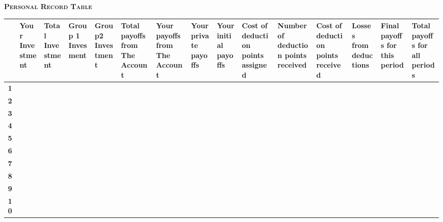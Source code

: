 \documentclass[9pt]{article}
\begin{document}
\thispagestyle{empty}

\begin{landscape}


{\bf \scshape Personal Record Table}


\begin{table}[H]
\centering
      \begin{tabular}{|c|p{1.5cm}|p{1.5cm}|p{1.5cm}|p{1.5cm}|p{1.5cm}|p{1.5cm}|p{1.5cm}|p{1.5cm}|p{1.5cm}|p{1.5cm}|p{1.5cm}|p{1.5cm}|p{1.5cm}|p{1.5cm}|} \hline

         & {\bf Your Investment}
         & {\bf Total Investment}
         & {\bf Group 1 Invesment}
         & {\bf Group2 Investment}
         & {\bf Total payoffs from The Account}
         & {\bf Your payoffs from The Account}
         & {\bf Your private payoffs}
         & {\bf Your initial payoffs}
         & {\bf Cost of deduction points assigned}
         & {\bf Number of deduction points received}
         & {\bf Cost of deduction points received}
         & {\bf Losses from deductions}
         & {\bf Final payoffs for this period}
         & {\bf Total payoffs for all periods}\\



         
         \hline\hline
         
         {\bf 1} & & & & & & & & & & & & & &\\[2ex]\hline
         {\bf 2} & & & & & & & & & & & & & &\\[2ex]\hline
         {\bf 3} & & & & & & & & & & & & & &\\[2ex]\hline
         {\bf 4} & & & & & & & & & & & & & &\\[2ex]\hline
         {\bf 5} & & & & & & & & & & & & & &\\[2ex]\hline
         {\bf 6} & & & & & & & & & & & & & &\\[2ex]\hline
         {\bf 7} & & & & & & & & & & & & & &\\[2ex]\hline
         {\bf 8} & & & & & & & & & & & & & &\\[2ex]\hline
         {\bf 9} & & & & & & & & & & & & & &\\[2ex]\hline
         {\bf 10} & & & & & & & & & & & & & &\\[2ex]\hline
         
         \hline






      \end{tabular}
\end{table}

\end{landscape}


\end{document}
